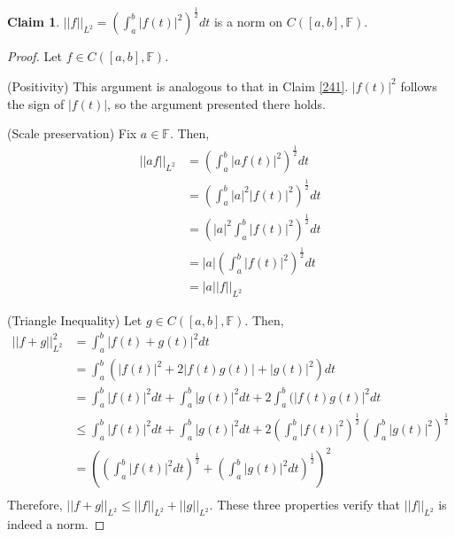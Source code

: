 \documentclass[letterpaper,12pt]{article}
\theoremstyle{definition}
\newtheorem{claim}[theorem]{Claim}
\begin{document}
\begin{claim}
	$||f||_{L^2} = \left(\int_a^b |f(t)|^2 \right)^\frac{1}{2} dt$ is a norm on $C([a,b],\mathbb{F})$.
\end{claim}
\begin{proof}
	Let $f \in C([a,b],\mathbb{F})$.
	
	(Positivity) This argument is analogous to that in Claim \ref{241}. $|f(t)|^2$ follows the sign of $|f(t)|$, so the argument presented there holds.
	
	(Scale preservation) Fix $a \in \mathbb{F}$. Then,
	\begin{align*}
	||af||_{L^2} &=  \left(\int_a^b |a f(t)|^2 \right)^\frac{1}{2} dt \\
					&=  \left(\int_a^b |a|^2 |f(t)|^2 \right)^\frac{1}{2} dt \\
					&= \left(|a|^2 \int_a^b |f(t)|^2 \right)^\frac{1}{2} dt \\
					&=  |a| \left(\int_a^b |f(t)|^2 \right)^\frac{1}{2} dt \\
					&= |a| |f||_{L^2} 
	\end{align*}
	
	(Triangle Inequality) Let $g \in C([a,b],\mathbb{F})$. Then,
	\begin{align*}
	||f + g||_{L^2}^2 &= \int_a^b |f(t) + g(t)|^2 dt \\
						 &=  \int_a^b(|f(t)|^2 + 2|f(t)g(t)| + |g(t)|^2) dt \\
						 &= \int_a^b |f(t)|^2 dt +  \int_a^b |g(t)|^2 dt  +  2 \int_a^b(|f(t)g(t)|^2 dt \\
						 &\leq \int_a^b |f(t)|^2 dt +  \int_a^b |g(t)|^2 dt + 2  \left(\int_a^b |f(t)|^2 \right)^\frac{1}{2}  \left(\int_a^b | g(t)|^2 \right)^\frac{1}{2} \tag{by Cauchy Schwarz} \\
						 &= \left( \left(\int_a^b |f(t)|^2 dt\right)^{\frac{1}{2}} + \left(\int_a^b |g(t)|^2 dt\right)^{\frac{1}{2}} \right)^2\\
	\end{align*}
	Therefore, $||f + g||_{L^2} \leq ||f||_{L^2} + ||g||_{L^2}$. These three properties verify that $||f||_{L^2}$ is indeed a norm.
\end{proof}
\end{document}
